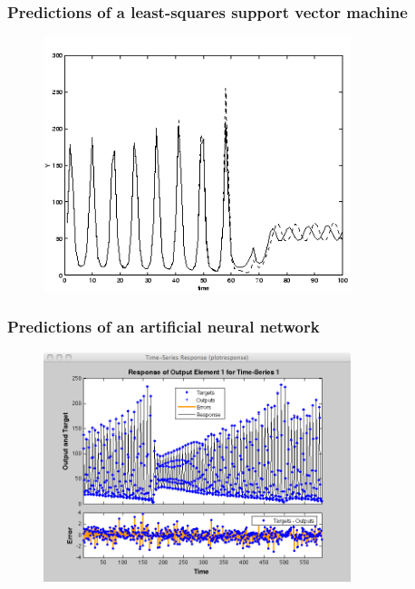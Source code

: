 \documentclass{beamer}
\begin{document}
\begin{frame}
\frametitle{Predictions of a least-squares support vector machine}
\begin{figure}[!h]
  \centering
  \includegraphics[width=0.8\textwidth]{santafe-prediction.png}
\end{figure}
\end{frame}


\begin{frame}
\frametitle{Predictions of an artificial neural network}
\begin{figure}[!h]
  \centering
  \includegraphics[width=0.8\textwidth]{santafe-matlab.png}
\end{figure}
\end{frame}
\end{document}
